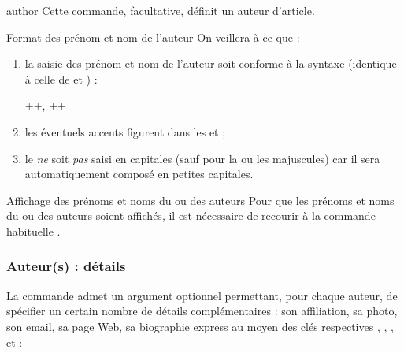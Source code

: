 \begin{docCommand}{author}{}
  Cette commande, facultative, définit un auteur d'article.
\end{docCommand}
%
\begin{dbwarning}{Format des prénom et nom de l'auteur}{}
  On veillera à ce que :
  \begin{enumerate}
  \item la saisie des prénom et nom de l'auteur soit conforme à la syntaxe
    (identique à celle de  et ) :
\begin{bodycode}[listing options={showspaces}]
++, ++
\end{bodycode}
  \item les éventuels accents figurent dans les  et
     ;
  \item le  \emph{ne} soit \emph{pas} saisi en capitales
    (sauf pour la ou les majuscules) car il sera automatiquement
    composé en petites capitales.
  \end{enumerate}
\end{dbwarning}

\begin{dbremark}{Affichage des prénoms et noms du ou des auteurs}{}
  Pour que les prénoms et noms du ou des auteurs soient affichés, il est
  nécessaire de recourir à la commande habituelle .
\end{dbremark}

\subsubsection{Auteur(s) : détails}
\label{sec-auteurs-details}

La commande  admet un argument optionnel permettant, pour chaque
auteur, de spécifier un certain nombre de détails complémentaires : son affiliation, sa
photo, son email, sa page Web, sa biographie express au moyen des clés
respectives %
, , ,  et
 :
\begin{bodycode}
\author[%
  affiliation=+\marg{affiliation(s)}+,%
  photo=+\meta{photo}+,%
  email=+\meta{email}+,%
  webpage=+\meta{page Web}+,%
  minibio=+\marg{biographie express}+%
]{++, ++}
\end{bodycode}

